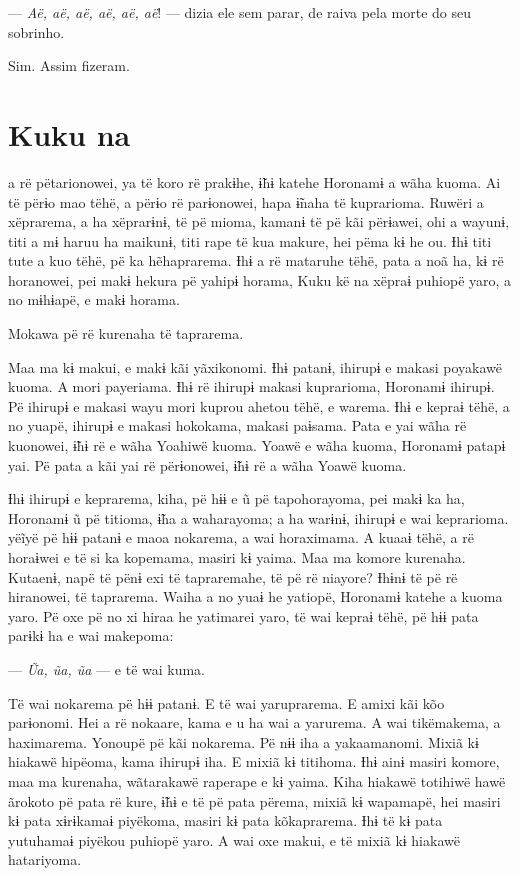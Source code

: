 --- \textit{Aë, aë, aë, aë, aë, aë}! --- dizia ele sem parar, de raiva pela morte
do seu sobrinho. 

Sim. Assim fizeram.

\chapter{Kuku na}
 
 a rë pëtarionowei, ya të koro rë prakɨhe, ɨ̃hɨ katehe Horonamɨ a
wãha kuoma. Ai të përɨo mao tëhë, a përɨo rë parɨonowei, hapa ɨ̃naha të
kuprarioma. Ruwëri a xëprarema, a ha xëprarɨnɨ, të pë mioma, kamanɨ të
pë kãi përɨawei, ohi a wayunɨ, titi a mɨ haruu ha maikunɨ, titi rape të
kua makure, hei pëma kɨ he ou. Ɨhɨ titi tute a kuo tëhë, pë ka
hẽhaprarema. Ɨhɨ a rë mataruhe tëhë, pata a noã ha, kɨ rë horanowei, pei
makɨ hekura pë yahipɨ horama, Kuku kë na xëpraɨ puhiopë yaro, a no
mɨhɨapë, e makɨ horama. 

Mokawa pë rë kurenaha të taprarema. 

Maa ma kɨ makui, e makɨ kãi yãxikonomi. Ɨhɨ patanɨ, ihirupɨ e makasi
poyakawë kuoma. A mori payeriama. Ɨhɨ rë ihirupɨ makasi kuprarioma,
Horonamɨ ihirupɨ. Pë ihirupɨ e makasi wayu mori kuprou ahetou tëhë, e
warema. Ɨhɨ e kepraɨ tëhë, a no yuapë, ihirupɨ e makasi hokokama, makasi
paɨsama. Pata e yai wãha rë kuonowei, ɨ̃hɨ rë e wãha Yoahiwë kuoma. Yoawë
e wãha kuoma, Horonamɨ patapɨ yai. Pë pata a kãi yai rë përɨonowei, ɨ̃hɨ
rë a wãha Yoawë kuoma. 

Ɨhɨ ihirupɨ e keprarema, kiha, pë hɨɨ e ũ pë tapohorayoma, pei makɨ ka
ha, Horonamɨ ũ pë titioma, ɨ̃ha a waharayoma; a ha warɨnɨ, ihirupɨ e wai
keprarioma. yëĩyë pë hɨɨ patanɨ e maoa nokarema, a wai horaximama. A kuaaɨ tëhë, a rë horaɨwei e të si ka kopemama, masiri kɨ yaima. Maa ma
komore kurenaha. Kutaenɨ, napë të pënɨ exi të tapraremahe, të pë rë
niayore? Ɨhɨnɨ të pë rë hiranowei, të taprarema. Waiha a no yuaɨ he
yatiopë, Horonamɨ katehe a kuoma yaro. Pë oxe pë no xi hiraa he
yatimarei yaro, të wai kepraɨ tëhë, pë hɨɨ pata parɨkɨ ha e wai
makepoma:

--- \textit{Ũa, ũa, ũa} --- e të wai kuma. 

Të wai nokarema pë hɨɨ patanɨ. E të wai yaruprarema. E amixi kãi kõo
parɨonomi. Hei a rë nokaare, kama e u ha wai a yarurema. A wai
tikëmakema, a haximarema. Yonoupë pë kãi nokarema. Pë nɨɨ iha a
yakaamanomi. Mixiã kɨ hiakawë hipëoma, kama ihirupɨ iha. E mixiã kɨ
titihoma. Ɨhɨ ainɨ masiri komore, maa ma kurenaha, wãtarakawë raperape e
kɨ yaima. Kiha hiakawë totihiwë hawë ãrokoto pë pata rë kure, ɨ̃hɨ e të
pë pata përema, mixiã kɨ wapamapë, hei masiri kɨ pata xɨrɨkamaɨ
piyëkoma, masiri kɨ pata kõkaprarema. Ɨhɨ të kɨ pata yutuhamaɨ piyëkou
puhiopë yaro. A wai oxe makui, e të mixiã kɨ hiakawë hatariyoma. 

